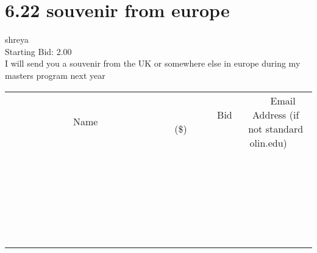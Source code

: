 \documentclass[11pt]{article}
\begin{document}
					\section*{6.22 souvenir from europe}
					shreya \\
					Starting Bid: 2.00 \\
					I will send you a souvenir from the UK or somewhere else in europe during my masters program next year \\
					[6ex]
					\begin{tabular}{c c c}
						~~~~~~~~~~~~~Name~~~~~~~~~~~~~ & ~~~~~~~~~Bid (\$)~~~~~~~~~ & ~~~Email Address (if not standard olin.edu)~~~ \\
				
 & & \\
\hline
 & & \\
\hline
 & & \\
\hline
 & & \\
\hline
 & & \\
\hline
 & & \\
\hline
 & & \\
\hline
 & & \\
\hline
 & & \\
\hline
 & & \\
\hline
 & & \\
\hline
 & & \\
\hline
 & & \\
\hline
 & & \\
\hline
 & & \\
\hline
 & & \\
\hline
 & & \\
\hline
 & & \\
\hline
 & & \\
\hline
 & & \\
\hline
 & & \\
\hline
 & & \\
\hline
 & & \\
\hline
 & & \\
\hline
 & & \\
\hline
 & & \\
\hline
					\end{tabular}
					\clearpage
				
\end{document}
